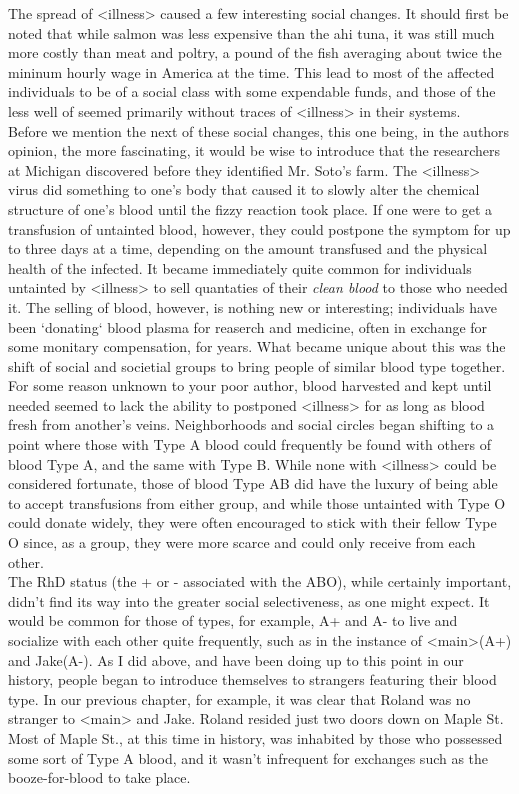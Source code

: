 \documentclass[12pt,openany]{memoir}
\begin{document}
The spread of <illness> caused a few interesting social changes.
It should first be noted that while salmon was less expensive than the ahi tuna, it was still much more costly than meat and poltry, a pound of the fish averaging about twice the mininum hourly wage in America at the time.
This lead to most of the affected individuals to be of a social class with some expendable funds, and those of the less well of seemed primarily without traces of <illness> in their systems.
\\

Before we mention the next of these social changes, this one being, in the authors opinion, the more fascinating, it would be wise to introduce that the researchers at Michigan discovered before they identified Mr. Soto's farm.
The <illness> virus did something to one's body that caused it to slowly alter the chemical structure of one's blood until the fizzy reaction took place.
If one were to get a transfusion of untainted blood, however, they could postpone the symptom for up to three days at a time, depending on the amount transfused and the physical health of the infected.
It became immediately quite common for individuals untainted by <illness> to sell quantaties of their \textit{clean blood} to those who needed it.
The selling of blood, however, is nothing new or interesting; individuals have been `donating` blood plasma for reaserch and medicine, often in exchange for some monitary compensation, for years.
What became unique about this was the shift of social and societial groups to bring people of similar blood type together.
\\

For some reason unknown to your poor author, blood harvested and kept until needed seemed to lack the ability to postponed <illness> for as long as blood fresh from another's veins.
Neighborhoods and social circles began shifting to a point where those with Type A blood could frequently be found with others of blood Type A, and the same with Type B.
While none with <illness> could be considered fortunate, those of blood Type AB did have the luxury of being able to accept transfusions from either group, and while those untainted with Type O could donate widely, they were often encouraged to stick with their fellow Type O since, as a group, they were more scarce and could only receive from each other.
\\

The RhD status (the + or - associated with the ABO), while certainly important, didn't find its way into the greater social selectiveness, as one might expect.
It would be common for those of types, for example, A+ and A- to live and socialize with each other quite frequently, such as in the instance of <main>(A+) and Jake(A-).
As I did above, and have been doing up to this point in our history, people began to introduce themselves to strangers featuring their blood type.
In our previous chapter, for example, it was clear that Roland was no stranger to <main> and Jake.
Roland resided just two doors down on Maple St.
Most of Maple St., at this time in history, was inhabited by those who possessed some sort of Type A blood, and it wasn't infrequent for exchanges such as the booze-for-blood to take place.
\\
\end{document}
